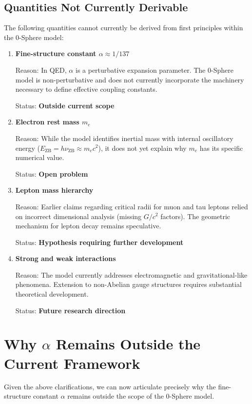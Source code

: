 \documentclass[12pt,letterpaper]{article}
\begin{document}
\subsection{Quantities Not Currently Derivable}
The following quantities cannot currently be derived from first principles within the 0-Sphere model:

\begin{enumerate}
\item \textbf{Fine-structure constant $\alpha \approx 1/137$}

Reason: In QED, $\alpha$ is a perturbative expansion parameter. The 0-Sphere model is non-perturbative and does not currently incorporate the machinery necessary to define effective coupling constants.

Status: \textbf{Outside current scope}

\item \textbf{Electron rest mass $m_e$}

Reason: While the model identifies inertial mass with internal oscillatory energy ($E_{\mathrm{ZB}} = h\nu_{\mathrm{ZB}} \approx m_e c^2$), it does not yet explain why $m_e$ has its specific numerical value.

Status: \textbf{Open problem}

\item \textbf{Lepton mass hierarchy}

Reason: Earlier claims regarding critical radii for muon and tau leptons relied on incorrect dimensional analysis (missing $G/c^2$ factors). The geometric mechanism for lepton decay remains speculative.

Status: \textbf{Hypothesis requiring further development}

\item \textbf{Strong and weak interactions}

Reason: The model currently addresses electromagnetic and gravitational-like phenomena. Extension to non-Abelian gauge structures requires substantial theoretical development.

Status: \textbf{Future research direction}

\end{enumerate}

\section{Why $\alpha$ Remains Outside the Current Framework}

Given the above clarifications, we can now articulate precisely why the fine-structure constant $\alpha$ remains outside the scope of the 0-Sphere model.
\end{document}
